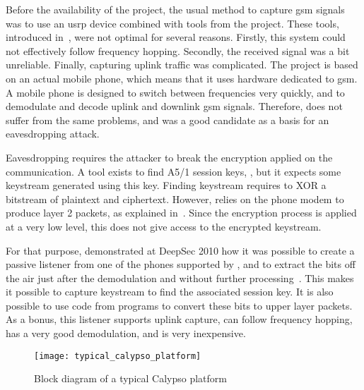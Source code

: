     Before the availability of the  project, the usual
    method to capture \gls{gsm} signals was to use an \gls{usrp} device
    combined with tools from the  project. These tools,
    introduced in~, were not optimal for several
    reasons. Firstly, this system could not effectively follow frequency
    hopping. Secondly, the received signal was a bit unreliable.
    Finally, capturing uplink traffic was complicated. The
     project is based on an actual mobile phone, which
    means that it uses hardware dedicated to \gls{gsm}. A mobile phone
    is designed to switch between frequencies very quickly, and to
    demodulate and decode uplink and downlink \gls{gsm} signals.
    Therefore,  does not suffer from the same problems,
    and was a good candidate as a basis for an eavesdropping attack.

    Eavesdropping requires the attacker to break the encryption applied
    on the communication. A tool exists to find A5/1 session keys,
    , but it expects some keystream generated using this
    key. Finding keystream requires to XOR a bitstream of plaintext and
    ciphertext. However,  relies on the phone modem to
    produce layer 2 packets, as explained in~. Since the
    encryption process is applied at a very low level, this does not
    give access to the encrypted keystream.

    For that purpose,  demonstrated at DeepSec 2010
    how it was possible to create a passive listener from one of the
    phones supported by , and to extract the bits off
    the air just after the demodulation and without further
    processing~\cite{munaut_cheap_2010}. This makes it possible to
    capture keystream to find the associated session key. It is also
    possible to use code from  programs to convert these
    bits to upper layer packets. As a bonus, this listener supports
    uplink capture, can follow frequency hopping, has a very good
    demodulation, and is very inexpensive. 

    \begin{figure}[h]
      \centering
      \texttt{[image: typical\_calypso\_platform]}
      \caption{Block diagram of a typical Calypso
              platform~\cite{munaut_further_2012}}
      \label{fig:typical_calypso_platform}
    \end{figure}

